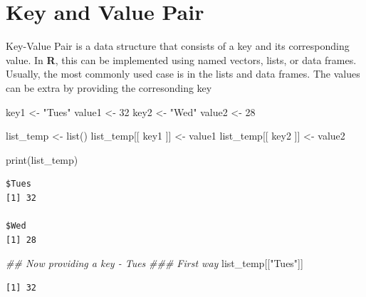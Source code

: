 \documentclass[
  letterpaper,
  DIV=11,
  numbers=noendperiod]{scrreprt}
\newenvironment{Shaded}{\begin{snugshade}}{\end{snugshade}}
\newcommand{\DecValTok}[1]{\textcolor[rgb]{0.68,0.00,0.00}{#1}}
\newcommand{\DocumentationTok}[1]{\textcolor[rgb]{0.37,0.37,0.37}{\textit{#1}}}
\newcommand{\FunctionTok}[1]{\textcolor[rgb]{0.28,0.35,0.67}{#1}}
\newcommand{\NormalTok}[1]{\textcolor[rgb]{0.00,0.23,0.31}{#1}}
\newcommand{\OtherTok}[1]{\textcolor[rgb]{0.00,0.23,0.31}{#1}}
\newcommand{\SpecialCharTok}[1]{\textcolor[rgb]{0.37,0.37,0.37}{#1}}
\newcommand{\StringTok}[1]{\textcolor[rgb]{0.13,0.47,0.30}{#1}}
\begin{document}
\section{Key and Value Pair}\label{key-and-value-pair}

Key-Value Pair is a data structure that consists of a key and its
corresponding value. In \textbf{R}, this can be implemented using named
vectors, lists, or data frames. Usually, the most commonly used case is
in the lists and data frames. The values can be extra by providing the
corresonding key

\begin{Shaded}
\begin{Highlighting}[]
\NormalTok{key1 }\OtherTok{\textless{}{-}} \StringTok{"Tues"}
\NormalTok{value1 }\OtherTok{\textless{}{-}} \DecValTok{32}
\NormalTok{key2 }\OtherTok{\textless{}{-}} \StringTok{"Wed"}
\NormalTok{value2 }\OtherTok{\textless{}{-}} \DecValTok{28}

\NormalTok{list\_temp }\OtherTok{\textless{}{-}} \FunctionTok{list}\NormalTok{()}
\NormalTok{list\_temp[[ key1 ]] }\OtherTok{\textless{}{-}}\NormalTok{ value1}
\NormalTok{list\_temp[[ key2 ]] }\OtherTok{\textless{}{-}}\NormalTok{ value2}

\FunctionTok{print}\NormalTok{(list\_temp)}
\end{Highlighting}
\end{Shaded}

\begin{verbatim}
$Tues
[1] 32

$Wed
[1] 28
\end{verbatim}

\begin{Shaded}
\begin{Highlighting}[]
\DocumentationTok{\#\# Now providing a key {-} Tues}
\DocumentationTok{\#\#\# First way}
\NormalTok{list\_temp[[}\StringTok{"Tues"}\NormalTok{]]}
\end{Highlighting}
\end{Shaded}

\begin{verbatim}
[1] 32
\end{verbatim}

\begin{Shaded}
\end{Shaded}
\end{document}
